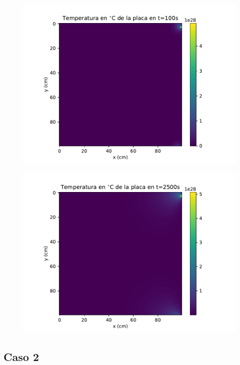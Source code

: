 \documentclass[12pt,letterpaper]{article}
\begin{document}
\begin{figure}[H]
\includegraphics{a1_100.pdf}
\centering
\end{figure}

\begin{figure}[H]
\includegraphics{a1_2500.pdf}
\centering
\end{figure}

\subsection*{Caso 2}
\end{document}

